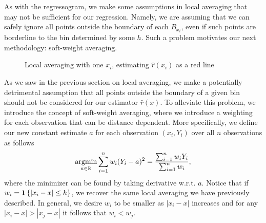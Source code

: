 As with the regressogram, we make some assumptions in local averaging that may not be sufficient for our regression. Namely, we are assuming that we can safely ignore all points outside the boundary of each $B_{x_i}$, even if such points are borderline to the bin determined by some $h$. Such a problem motivates our next methodology: soft-weight averaging. 

\begin{figure}
	\begin{center}
		\caption{Local averaging with one $x_i$, estimating $\hat{r}(x_i)$ as a red line}
		\label{fig:local averaging}
	\end{center}
\end{figure}



As we saw in the previous section on local averaging, we make a potentially detrimental assumption that all points outside the boundary of a given bin should not be considered for our estimator $\hat{r}(x)$. To alleviate this problem, we introduce the concept of soft-weight averaging, where we introduce a weighting for each observation that can be distance dependent. More specifically, we define our new constant estimate $a$ for each observation $(x_i, Y_i)$ over all $n$ observations as follows
 \begin{equation}\operatorname*{\textup{argmin}}_{a \in \mathbb R} \sum_{i = 1}^n w_i (Y_i - a)^2 =\frac{\sum_{i = 1}^n w_iY_i}{\sum_{i = 1}^n w_i},\end{equation} 
where the minimizer can be found by taking derivative w.r.t. $a$. Notice that if $w_i = \bm{1}\left\{|x_i - x| \leq h\right\}$, we recover the same local averaging we have previously described. In general, we desire $w_i$ to be smaller as $| x_i - x |$ increases and for any  $| x_i - x | > | x_j - x |$ it follows that $w_i < w_j$. 

